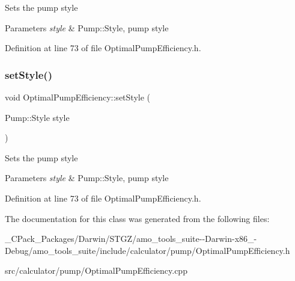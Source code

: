 Sets the pump style 
\begin{DoxyParams}{Parameters}
{\em style} & Pump\+::\+Style, pump style \\
\hline
\end{DoxyParams}


Definition at line 73 of file Optimal\+Pump\+Efficiency.\+h.

\mbox{\label{class_optimal_pump_efficiency_ab6b85c8c08d6641c5375c65436f16a2f}} 
\subsubsection{\texorpdfstring{set\+Style()}{setStyle()}\hspace{0.1cm}{\footnotesize\ttfamily [3/3]}}
{\footnotesize\ttfamily void Optimal\+Pump\+Efficiency\+::set\+Style (\begin{DoxyParamCaption}\item[{Pump\+::\+Style}]{style }\end{DoxyParamCaption})\hspace{0.3cm}{\ttfamily [inline]}}

Sets the pump style 
\begin{DoxyParams}{Parameters}
{\em style} & Pump\+::\+Style, pump style \\
\hline
\end{DoxyParams}


Definition at line 73 of file Optimal\+Pump\+Efficiency.\+h.



The documentation for this class was generated from the following files\+:\begin{DoxyCompactItemize}
\item 
\+\_\+\+C\+Pack\+\_\+\+Packages/\+Darwin/\+S\+T\+G\+Z/amo\+\_\+tools\+\_\+suite-\/-\/\+Darwin-\/x86\+\_-\/\+Debug/amo\+\_\+tools\+\_\+suite/include/calculator/pump/Optimal\+Pump\+Efficiency.\+h\item 
src/calculator/pump/Optimal\+Pump\+Efficiency.\+cpp\end{DoxyCompactItemize}
